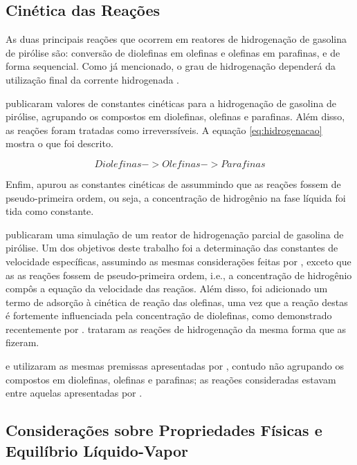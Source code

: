 \subsection{Cinética das Reações} \label{sec:cineticadasreacoes}

As duas principais reações que ocorrem em reatores de hidrogenação de gasolina
de pirólise são: conversão de diolefinas em olefinas e olefinas em parafinas, e
de forma sequencial. Como já mencionado, o grau de hidrogenação dependerá da
utilização final da corrente hidrogenada .

 publicaram valores de constantes cinéticas para a
hidrogenação de gasolina de pirólise, agrupando os compostos em diolefinas,
olefinas e parafinas. Além disso, as reações foram tratadas como irreverssíveis.
A equação \autoref{eq:hidrogenacao} mostra o que foi descrito.

\begin{equation}
Diolefinas -> Olefinas -> Parafinas
\label{eq:hidrogenacao}
\end{equation}

Enfim,  apurou as constantes cinéticas de assummindo que
as reações fossem de pseudo-primeira ordem, ou seja, a concentração de
hidrogênio na fase líquida foi tida como constante.

 publicaram uma simulação de um reator de
hidrogenação parcial de gasolina de pirólise. Um dos objetivos deste trabalho
foi a determinação das constantes de velocidade específicas, assumindo as
mesmas considerações feitas por , exceto que as as
reações fossem de pseudo-primeira ordem, i.e., a concentração de hidrogênio
compôs a equação da velocidade das reaçãos. Além disso, foi adicionado um termo
de adsorção à cinética de reação das olefinas, uma vez que a reação destas é
fortemente influenciada pela concentração de diolefinas, como demonstrado
recentemente por .  trataram
as reações de hidrogenação da mesma forma que  as
fizeram.

 e  utilizaram as mesmas
premissas apresentadas por , contudo não agrupando os
compostos em diolefinas, olefinas e parafinas; as reações consideradas estavam
entre aquelas apresentadas por .

\subsection{Considerações sobre Propriedades Físicas e Equilíbrio Líquido-Vapor}
\label{sec:consideracoeselv}

